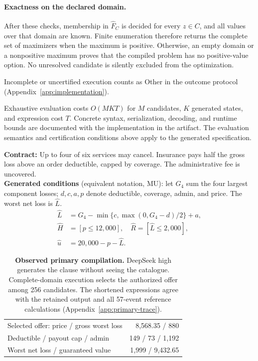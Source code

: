 \paragraph{Exactness on the declared domain.}
After these checks, membership in $\widehat F_C$ is decided for every $z\in C$, and all values over that domain are known. Finite enumeration therefore returns the complete set of maximizers when the maximum is positive. Otherwise, an empty domain or a nonpositive maximum proves that the compiled problem has no positive-value option. No unresolved candidate is silently excluded from the optimization.

Incomplete or uncertified execution counts as Other in the outcome protocol (Appendix~\ref{app:implementation}).

Exhaustive evaluation costs $O(MKT)$ for $M$ candidates, $K$ generated states, and expression cost $T$. Concrete syntax, serialization, decoding, and runtime bounds are documented with the implementation in the artifact. The evaluation semantics and certification conditions above apply to the generated specification.

\begin{table}[t]
\centering\small
\begin{minipage}{\columnwidth}
\textbf{Contract:} Up to four of six services may cancel. Insurance pays half the gross loss above an order deductible, capped by coverage. The administrative fee is uncovered.\\[3pt]
\textbf{Generated conditions} (equivalent notation, MU): let $G_4$ sum the four largest component losses; $d,c,a,p$ denote deductible, coverage, admin, and price. The worst net loss is $\widehat L$.
\[
\begin{aligned}
\widehat L&=G_4-\min\{c,\max(0,G_4-d)/2\}+a,\\
\widehat H&=[p\le12{,}000],\quad
\widehat R=[\widehat L\le2{,}000],\\
\widehat u&=20{,}000-p-\widehat L.
\end{aligned}
\]
\end{minipage}
\begin{tabular}{@{}lr@{}}
\toprule
Selected offer: price / gross worst loss & 8,568.35 / 880\\
Deductible / payout cap / admin & 149 / 73 / 1,192\\
Worst net loss / guaranteed value & 1,999 / 9,432.65\\
\bottomrule
\end{tabular}
\caption{\textbf{Observed primary compilation.} DeepSeek high generates the clause without seeing the catalogue. Complete-domain execution selects the authorized offer among 256 candidates. The shortened expressions agree with the retained output and all 57-event reference calculations (Appendix~\ref{app:primary-trace}).}
\label{tab:primary-trace}
\end{table}

